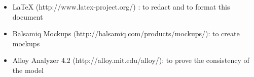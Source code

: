 \begin{itemize}
	\item LaTeX (http://www.latex-project.org/) : to redact and to format this document
	\item Balsamiq Mockups (http://balsamiq.com/products/mockups/): to create
	mockups
	\item Alloy Analyzer 4.2 (http://alloy.mit.edu/alloy/): to prove the consistency of the model
	
\end{itemize}